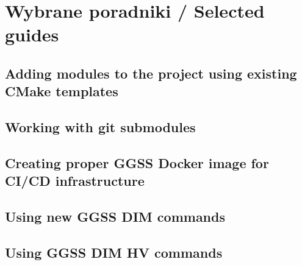 \chapter{Wybrane poradniki / Selected guides} %
\label{cha:howtos}


\section{Adding modules to the project using existing CMake templates}
\section{Working with git submodules}
\section{Creating proper GGSS Docker image for CI/CD infrastructure}
\section{Using new GGSS DIM commands}
\section{Using GGSS DIM HV commands}